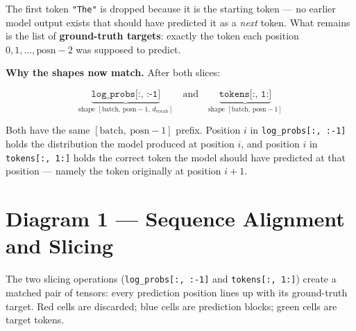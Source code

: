 \documentclass[10pt]{article}
\begin{document}
\medskip\noindent
The first token \texttt{"The"} is dropped because it is the starting token
--- no earlier model output exists that should have predicted it as a
\emph{next} token. What remains is the list of \textbf{ground-truth targets}:
exactly the token each position $0, 1, \ldots, \text{posn}-2$ was supposed
to predict.

\medskip\noindent
\textbf{Why the shapes now match.}
After both slices:

\[
  \underbrace{\texttt{log\_probs[:, :-1]}}_{\text{shape }[\text{batch},\,\text{posn}-1,\,d_\text{vocab}]}
  \quad\text{and}\quad
  \underbrace{\texttt{tokens[:, 1:]}}_{\text{shape }[\text{batch},\,\text{posn}-1]}
\]

Both have the same $[\text{batch},\ \text{posn}-1]$ prefix.
Position $i$ in \texttt{log\_probs[:, :-1]} holds the distribution the
model produced at position $i$, and position $i$ in \texttt{tokens[:, 1:]}
holds the correct token the model should have predicted at that
position --- namely the token originally at position $i+1$.

\section{Diagram 1 --- Sequence Alignment and Slicing}

The two slicing operations (\texttt{log\_probs[:,~:-1]} and \texttt{tokens[:,~1:]})
create a matched pair of tensors: every prediction position lines up with its
ground-truth target. \textcolor{red!60!black}{Red} cells are discarded;
\textcolor{blue!60!black}{blue} cells are prediction blocks;
\textcolor{green!50!black}{green} cells are target tokens.
\end{document}
